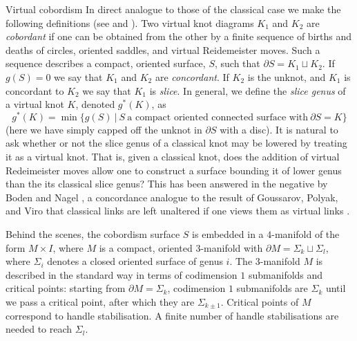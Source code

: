 \documentclass[10pt,oneside]{amsart}
\theoremstyle{definition}
\numberwithin{equation}{section}
\begin{document}
{		{\normalfont\bfseries\large}}{Virtual cobordism}\label{Sec:virtualcobordism}
In direct analogue to those of the classical case we make the following definitions (see \cite{Dye2014} and \cite{Kauffman1998c}). Two virtual knot diagrams \( K_1 \) and \( K_2 \) are \emph{cobordant} if one can be obtained from the other by a finite sequence of births and deaths of circles, oriented saddles, and virtual Reidemeister moves. Such a sequence describes a compact, oriented surface, \( S \), such that \( \partial S = K_1 \sqcup K_2 \). If \( g ( S ) = 0 \) we say that \( K_1 \) and \( K_2 \) are \emph{concordant}. If \( K_2 \) is the unknot, and \( K_1 \) is concordant to \( K_2 \) we say that \( K_1 \) is \textit{slice}. In general, we define the \emph{slice genus} of a virtual knot \( K \), denoted \( g^\ast ( K ) \), as
\begin{equation*}
g^\ast ( K ) = \min \lbrace g ( S ) ~|~ S ~\text{a compact oriented connected surface with}~ \partial S = K \rbrace
\end{equation*}
(here we have simply capped off the unknot in \( \partial S \) with a disc). It is natural to ask whether or not the slice genus of a classical knot may be lowered by treating it as a virtual knot. That is, given a classical knot, does the addition of virtual Redeimeister moves allow one to construct a surface bounding it of lower genus than the its classical slice genus? This has been answered in the negative by Boden and Nagel \cite{Boden2016}, a concordance analogue to the result of Goussarov, Polyak, and Viro that classical links are left unaltered if one views them as virtual links \cite{Goussarov1998}.

Behind the scenes, the cobordism surface \( S \) is embedded in a \( 4 \)-manifold of the form \( M \times I \), where \( M \) is a compact, oriented \(3\)-manifold with \( \partial M = \Sigma_k \sqcup \Sigma_l \), where \( \Sigma_i \) denotes a closed oriented surface of genus \( i \). The \( 3 \)-manifold \( M \) is described in the standard way in terms of codimension \( 1 \) submanifolds and critical points: starting from \( \partial M = \Sigma_k \), codimension \( 1 \) submanifolds are \( \Sigma_k \) until we pass a critical point, after which they are \( \Sigma_{k \pm 1} \). Critical points of \( M \) correspond to handle stabilisation. A finite number of handle stabilisations are needed to reach \( \Sigma_l \).
\end{document}
